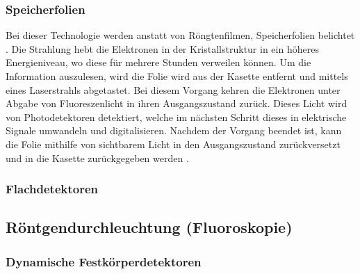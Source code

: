 \subsubsection{Speicherfolien}
\label{subsubsec:Speicherfolien}
Bei dieser Technologie werden anstatt von Röngtenfilmen, Speicherfolien belichtet \cite{Medizinische Physik}. Die Strahlung hebt die Elektronen in der
Kristallstruktur in ein höheres Energieniveau, wo diese für mehrere Stunden verweilen können. Um die Information auszulesen, wird 
die Folie wird aus der Kasette entfernt und mittels eines Laserstrahls abgetastet. Bei diesem Vorgang kehren die Elektronen unter
Abgabe von Fluoreszenlicht in ihren Ausgangszustand zurück. Dieses Licht wird von Photodetektoren detektiert, welche
im nächsten Schritt dieses in elektrische Signale umwandeln und digitalisieren. Nachdem der Vorgang beendet ist, kann die Folie 
mithilfe von sichtbarem Licht in den Ausgangszustand zurückversetzt und in die Kasette zurückgegeben werden \cite{Medizintechnik}.


\subsubsection{Flachdetektoren}
\label{subsubsec:Flachdetektoren}








\subsection{Röntgendurchleuchtung (Fluoroskopie)}
\label{sec:Fluoroskopie}
\subsubsection{Dynamische Festkörperdetektoren}
\label{subsubsec:Festkörperdetektoren}




